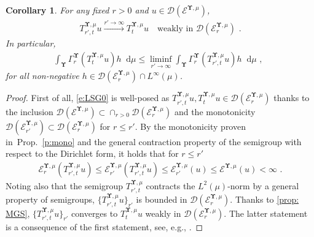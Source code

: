 \documentclass[11pt,letterpaper]{amsart}
\newcommand{\dom}[1]{\mathcal D(#1)}
\newcommand{\diff}{\mathop{}\!\mathrm{d}}
\newcommand{\comma}{\,\,\mathrm{,}\;\,}
\newcommand{\fstop}{\,\,\mathrm{.}}
\newcommand{\cdc}{\Gamma}
\newcommand{\QP}{{\mu}}
\newcommand{\dUpsilon}{{\mathbf \Upsilon}}
\newcommand{\U}{\dUpsilon}
\newcommand{\E}{\mathcal E}
\renewcommand{\1}{\mathbf 1}
\numberwithin{equation}{section}
\theoremstyle{plain}
\newtheorem{cor}[thm]{Corollary}%
\theoremstyle{definition}
\theoremstyle{remark}
\begin{document}
\begin{cor} \label{c:LSG}For any fixed $r>0$ and $u \in \dom{\E^{\U, \QP}}$, 
\begin{align} \label{e:LSG0}
T_{r', t}^{\U, \QP}u \xrightarrow{r' \to \infty} T_t^{\U, \QP} u \quad \text{weakly in $\dom{\E^{\U, \QP}_{r}}$} \fstop
\end{align}
In particular, 
\begin{align} \label{e:LSG}
\int_{\U} \cdc^{\U}_r(T^{\U, \QP}_tu)h \diff \QP 
 \le  \liminf_{r' \to \infty} \int_{\U} \cdc^{\U}_{r}(T_{r', t}^{\U, \QP}u)   h \diff \QP  \comma
\end{align}
for all non-negative $h \in \mathcal D(\E^{\U, \QP}_r) \cap L^\infty(\QP)$.
\end{cor}
\begin{proof}
First of all, \eqref{e:LSG0} is well-posed as $T_{r', t}^{\U, \QP}u, T_t^{\U, \QP} u \in \dom{\E^{\U, \QP}_{r}}$ thanks to the inclusion $\dom{\E^{\U, \QP}}\subset \cap_{r>0} \dom{\E^{\U, \QP}_r}$ and the monotonicity $\dom{\E^{\U, \QP}_{r'}} \subset  \dom{\E^{\U, \QP}_{r}}$ for $r \le r'$. 
%
By the monotonicity proven in~Prop.~\ref{p:mono} and the general contraction property of the semigroup with respect to the Dirichlet form, it holds that for $r \le r'$
\begin{align*}
\E^{\U, \QP}_{r}(T_{r', t}^{\U, \QP}u) \le \E^{\U, \QP}_{r'}(T_{r', t}^{\U, \QP}u) \le \E^{\U, \QP}_{r'}(u) \le  \E^{\U, \QP}(u)<\infty \fstop
\end{align*}
Noting also that the semigroup $T_{r', t}^{\U, \QP}$ contracts the $L^2(\QP)$-norm by a general property of semigroups, $\{T_{r', t}^{\U, \QP}u\}_{r'}$ is bounded in $\dom{\E^{\U, \QP}_{r}}$. Thanks to \eqref{prop: MGS},  $\{T_{r', t}^{\U, \QP}u\}_{r'}$ converges to $T_{t}^{\U, \QP}u$ weakly in $\dom{\E^{\U, \QP}_{r}}$. 
The latter statement is a consequence of the first statement, see, e.g., \cite[Lem.~2.4]{HinRam03}. 
\end{proof}
\end{document}
